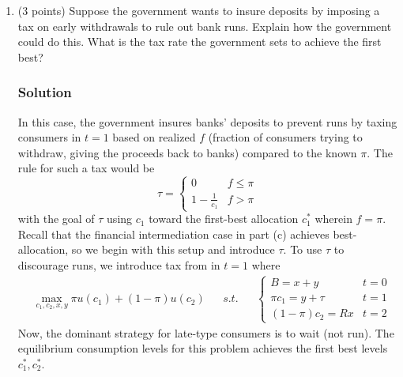 \documentclass[12pt]{article}
\begin{document}
\begin{enumerate}[label=(\alph*)]
    \item (3 points) Suppose the government wants to insure deposits by imposing a tax on early withdrawals to rule out bank runs. Explain how the government could do this. What is the tax rate the government sets to achieve the first best?
\subsubsection*{Solution}


    In this case, the government insures banks' deposits to prevent runs by taxing consumers in $t=1$ based on realized $f$ (fraction of consumers trying to withdraw, giving the proceeds back to banks) compared to the known $\pi$.
    The rule  for such a tax would be 
    \[ \tau = \begin{cases}
        0 & f \leq \pi 
        \\ 1 - \frac{1}{c_1} & f > \pi 
    \end{cases}\]
    with the goal of $\tau$ using $c_1$ toward the first-best allocation $c_1^*$ wherein $f =\pi$. Recall that the financial intermediation case in part (c) achieves best-allocation, so we begin with this setup and introduce $\tau$. To use $\tau$ to discourage runs, we introduce tax from in $t=1$ where
    \begin{align*}
        &\max_{c_1, c_2, x,y} \pi u(c_1) + (1-\pi)u(c_2) && s.t. && \begin{cases}
            B  =x+y & t=0
            \\ \pi c_1 =y + \tau & t=1
            \\ (1-\pi) c_2 = Rx & t=2
        \end{cases}
    \end{align*}
    Now, the dominant strategy for late-type consumers is to wait (not run). The equilibrium consumption levels for this problem achieves the first best levels $c_1^*, c_2^*.$


\end{enumerate}
\end{document}
